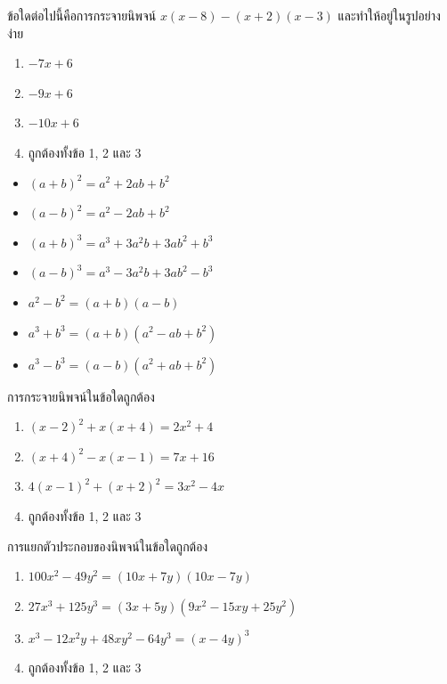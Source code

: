 \begin{examplebox}
	ข้อใดต่อไปนี้คือการกระจายนิพจน์ $x(x-8)-(x+2)(x-3)$ และทำให้อยู่ในรูปอย่างง่าย
	\begin{enumerate}
		\item $-7 x+6$
		\item $-9 x+6$
		\item $-10 x+6$
		\item ถูกต้องทั้งข้อ 1, 2 และ 3
	\end{enumerate}
\end{examplebox}


\begin{remarkbox}
	\begin{itemize}
		\item[*] $(a+b)^2=a^2+2ab+b^2$
		\item[*] $(a-b)^2=a^2-2ab+b^2$
		\item[*] $(a+b)^3=a^3+3a^2b+3ab^2+b^3$
		\item[*] $(a-b)^3=a^3-3a^2b+3ab^2-b^3$
		\item[*] $a^2-b^2=(a+b)(a-b)$
		\item[*] $a^3+b^3=(a+b)(a^2-ab+b^2)$
		\item[*] $a^3-b^3=(a-b)(a^2+ab+b^2)$
	\end{itemize}   
\end{remarkbox}

\begin{examplebox}
	การกระจายนิพจน์ในข้อใดถูกต้อง
	\begin{enumerate}
		\item $(x-2)^2+x(x+4)=2 x^2+4$
		\item $(x+4)^2-x(x-1)=7 x+16$
		\item $4(x-1)^2+(x+2)^2=3 x^2-4 x$
		\item ถูกต้องทั้งข้อ 1, 2 และ 3
	\end{enumerate}
\end{examplebox}

\begin{examplebox}
	การแยกตัวประกอบของนิพจน์ในข้อใดถูกต้อง
	\begin{enumerate}
		\item $100 x^2-49 y^2=(10 x+7 y)(10 x-7 y)$
		\item $27 x^3+125 y^3=(3 x+5 y)\left(9 x^2-15 x y+25 y^2\right)$
		\item $x^3-12 x^2 y+48 x y^2-64 y^3=(x-4 y)^3$
		\item ถูกต้องทั้งข้อ 1, 2 และ 3
	\end{enumerate}
\end{examplebox}

